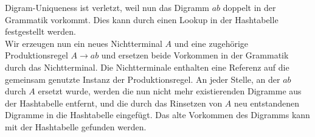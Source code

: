 \begin{figure}[H]
	\centering
	
\end{figure}
Digram-Uniqueness ist verletzt, weil nun das Digramm $ab$ doppelt in der Grammatik vorkommt. Dies kann durch einen Lookup in der Hashtabelle festgestellt werden.\\
Wir erzeugen nun ein neues Nichtterminal $A$ und eine zugehörige Produktionsregel $A \rightarrow ab$  und ersetzen beide Vorkommen in der Grammatik durch das Nichtterminal. Die Nichtterminale enthalten eine Referenz auf die gemeinsam genutzte Instanz der Produktionsregel. An jeder Stelle, an der $ab$ durch $A$ ersetzt wurde, werden die nun nicht mehr existierenden Digramme aus der Hashtabelle entfernt, und die durch das Rinsetzen von $A$ neu entstandenen Digramme in die Hashtabelle eingefügt.
Das alte Vorkommen des Digramms kann mit der Hashtabelle gefunden werden. 

